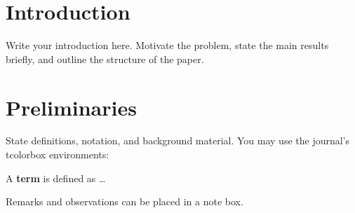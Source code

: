 
\section{Introduction}

Write your introduction here.  Motivate the problem, state the main
results briefly, and outline the structure of the paper.

\section{Preliminaries}

State definitions, notation, and background material.  You may use
the journal's tcolorbox environments:

\begin{definitionbox}
  A \textbf{term} is defined as \ldots
\end{definitionbox}

\begin{notebox}
  Remarks and observations can be placed in a note box.
\end{notebox}
